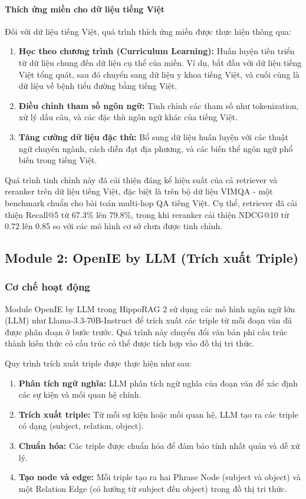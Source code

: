\paragraph{Thích ứng miền cho dữ liệu tiếng Việt}
Đối với dữ liệu tiếng Việt, quá trình thích ứng miền được thực hiện thông qua:

\begin{enumerate}
    \item \textbf{Học theo chương trình (Curriculum Learning):} Huấn luyện tiến triển từ dữ liệu chung đến dữ liệu cụ thể của miền. Ví dụ, bắt đầu với dữ liệu tiếng Việt tổng quát, sau đó chuyển sang dữ liệu y khoa tiếng Việt, và cuối cùng là dữ liệu về bệnh tiểu đường bằng tiếng Việt.
    
    \item \textbf{Điều chỉnh tham số ngôn ngữ:} Tinh chỉnh các tham số như tokenization, xử lý dấu câu, và các đặc thù ngôn ngữ khác của tiếng Việt.
    
    \item \textbf{Tăng cường dữ liệu đặc thù:} Bổ sung dữ liệu huấn luyện với các thuật ngữ chuyên ngành, cách diễn đạt địa phương, và các biến thể ngôn ngữ phổ biến trong tiếng Việt.
\end{enumerate}

Quá trình tinh chỉnh này đã cải thiện đáng kể hiệu suất của cả retriever và reranker trên dữ liệu tiếng Việt, đặc biệt là trên bộ dữ liệu VIMQA - một benchmark chuẩn cho bài toán multi-hop QA tiếng Việt. Cụ thể, retriever đã cải thiện Recall@5 từ 67.3\% lên 79.8\%, trong khi reranker cải thiện NDCG@10 từ 0.72 lên 0.85 so với các mô hình cơ sở chưa được tinh chỉnh.

\subsection{Module 2: OpenIE by LLM (Trích xuất Triple)}

\subsubsection{Cơ chế hoạt động}
Module OpenIE by LLM trong HippoRAG 2 sử dụng các mô hình ngôn ngữ lớn (LLM) như Llama-3.3-70B-Instruct để trích xuất các triple từ mỗi đoạn văn đã được phân đoạn ở bước trước. Quá trình này chuyển đổi văn bản phi cấu trúc thành kiến thức có cấu trúc có thể được tích hợp vào đồ thị tri thức.

Quy trình trích xuất triple được thực hiện như sau:
\begin{enumerate}
    \item \textbf{Phân tích ngữ nghĩa:} LLM phân tích ngữ nghĩa của đoạn văn để xác định các sự kiện và mối quan hệ chính.
    \item \textbf{Trích xuất triple:} Từ mỗi sự kiện hoặc mối quan hệ, LLM tạo ra các triple có dạng (subject, relation, object).
    \item \textbf{Chuẩn hóa:} Các triple được chuẩn hóa để đảm bảo tính nhất quán và dễ xử lý.
    \item \textbf{Tạo node và edge:} Mỗi triple tạo ra hai Phrase Node (subject và object) và một Relation Edge (có hướng từ subject đến object) trong đồ thị tri thức.
\end{enumerate}

